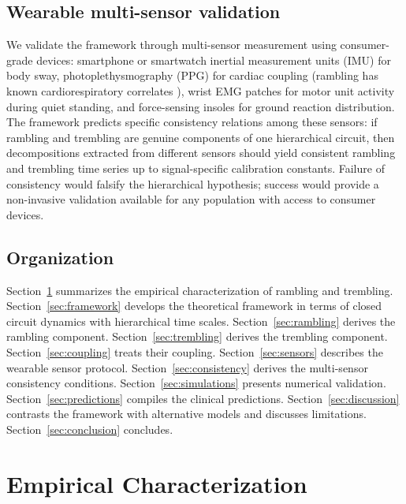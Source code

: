 \documentclass[11pt,twocolumn,a4paper]{article}
\theoremstyle{definition}
\theoremstyle{remark}
\begin{document}
\subsection{Wearable multi-sensor validation}

We validate the framework through multi-sensor measurement using
consumer-grade devices: smartphone or smartwatch inertial
measurement units (IMU) for body sway, photoplethysmography (PPG)
for cardiac coupling (rambling has known cardiorespiratory
correlates \citep{bonnet2014,hunter2008}), wrist EMG patches for
motor unit activity during quiet standing, and force-sensing insoles
for ground reaction distribution. The framework predicts specific
consistency relations among these sensors: if rambling and trembling
are genuine components of one hierarchical circuit, then
decompositions extracted from different sensors should yield
consistent rambling and trembling time series up to signal-specific
calibration constants. Failure of consistency would falsify the
hierarchical hypothesis; success would provide a non-invasive
validation available for any population with access to consumer
devices.

\subsection{Organization}

Section~\ref{sec:empirical} summarizes the empirical characterization
of rambling and trembling. Section~\ref{sec:framework} develops the
theoretical framework in terms of closed circuit dynamics with
hierarchical time scales. Section~\ref{sec:rambling} derives the
rambling component. Section~\ref{sec:trembling} derives the trembling
component. Section~\ref{sec:coupling} treats their coupling.
Section~\ref{sec:sensors} describes the wearable sensor protocol.
Section~\ref{sec:consistency} derives the multi-sensor consistency
conditions. Section~\ref{sec:simulations} presents numerical
validation. Section~\ref{sec:predictions} compiles the clinical
predictions. Section~\ref{sec:discussion} contrasts the framework
with alternative models and discusses limitations.
Section~\ref{sec:conclusion} concludes.


\section{Empirical Characterization}
\label{sec:empirical}
\end{document}
